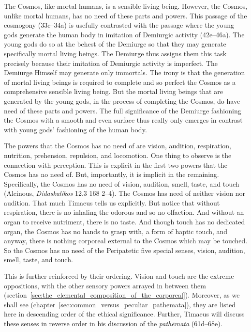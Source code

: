The Cosmos, like mortal humans, is a sensible living being. However, the Cosmos, unlike mortal humans, has no need of these parts and powers. This passage of the cosmogony (33c--34a) is usefully contrasted with the passage where the young gods generate the human body in imitation of Demiurgic activity (42e--46a). The young gods do so at the behest of the Demiurge so that they may generate specifically mortal living beings. The Demiurge thus assigns them this task precisely because their imitation of Demiurgic activity is imperfect. The Demiurge Himself may generate only immortals. The irony is that the generation of mortal living beings is required to complete and so perfect the Cosmos as a comprehensive sensible living being. But the mortal living beings that are generated by the young gods, in the process of completing the Cosmos, do have need of these parts and powers. The full significance of the Demiurge fashioning the Cosmos with a smooth and even surface thus really only emerges in contrast with young gods' fashioning of the human body. 

The powers that the Cosmos has no need of are vision, audition, respiration, nutrition, prehension, repulsion, and locomotion. One thing to observe is the connection with perception. This is explicit in the first two powers that the Cosmos has no need of. But, importantly, it is implicit in the remaining. Specifically, the Cosmos has no need of vision, audition, smell, taste, and touch (Alcinous, \emph{Didaskalikos} 12.3 168 2--4). The Cosmos has need of neither vision nor audition. That much Timaeus tells us explicitly. But notice that without respiration, there is no inhaling the odorous and so no olfaction. And without an organ to receive nutriment, there is no taste. And though touch has no dedicated organ, the Cosmos has no hands to grasp with, a form of haptic touch, and anyway, there is nothing corporeal external to the Cosmos which may be touched. So the Cosmos has no need of the Peripatetic five special senses, vision, audition, smell, taste, and touch. 

This is further reinforced by their ordering. Vision and touch are the extreme oppositions, with the other sensory powers arrayed in between them (section~\ref{sec:the_elemental_composition_of_the_corporeal}). Moreover, as we shall see (chapter~\ref{sec:common_versus_peculiar_pathemata}), they are listed here in descending order of the ethical significance. Further, Timaeus will discuss these senses in reverse order in his discussion of the \emph{pathēmata} (61d--68e). 

